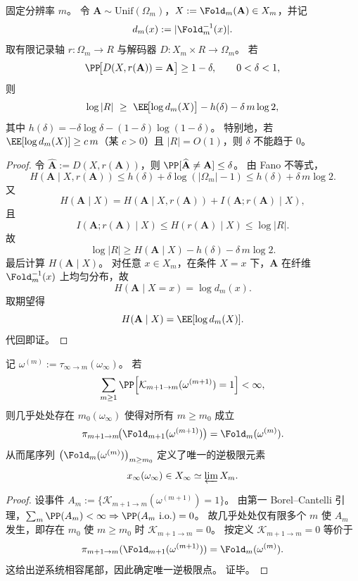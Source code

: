 \begin{theorem}\label{thm:killo-fold-approx-address-fano-lower-bound}
固定分辨率 \(m\)。
令 \(\mathbf A\sim\mathrm{Unif}(\Omega_m)\)，\(X:=\Fold_m(\mathbf A)\in X_m\)，并记
\[
d_m(x):=|\Fold_m^{-1}(x)|.
\]
取有限记录轴 \(r:\Omega_m\to R\) 与解码器 \(D:X_m\times R\to\Omega_m\)。
若
\[
\PP\!\bigl[D(X,r(\mathbf A))=\mathbf A\bigr]\ge 1-\delta,\qquad 0<\delta<1,
\]
则
\[
\log|R|\ \ge\ \EE\!\bigl[\log d_m(X)\bigr]-h(\delta)-\delta\,m\log 2,
\]
其中 \(h(\delta)=-\delta\log\delta-(1-\delta)\log(1-\delta)\)。
特别地，若 \(\EE[\log d_m(X)]\ge c\,m\)（某 \(c>0\)）且 \(|R|=O(1)\)，则 \(\delta\) 不能趋于 \(0\)。
\end{theorem}
\begin{proof}
令 \(\widehat{\mathbf A}:=D(X,r(\mathbf A))\)，则
\(
\PP[\widehat{\mathbf A}\neq \mathbf A]\le \delta
\)。
由 Fano 不等式，
\[
H(\mathbf A\mid X,r(\mathbf A))
\le
h(\delta)+\delta\log(|\Omega_m|-1)
\le
h(\delta)+\delta\,m\log 2.
\]
又
\[
H(\mathbf A\mid X)
=
H(\mathbf A\mid X,r(\mathbf A))+I(\mathbf A;r(\mathbf A)\mid X),
\]
且
\[
I(\mathbf A;r(\mathbf A)\mid X)\le H(r(\mathbf A)\mid X)\le \log|R|.
\]
故
\[
\log|R|
\ge
H(\mathbf A\mid X)-h(\delta)-\delta\,m\log 2.
\]
最后计算 \(H(\mathbf A\mid X)\)。
对任意 \(x\in X_m\)，在条件 \(X=x\) 下，\(\mathbf A\) 在纤维 \(\Fold_m^{-1}(x)\) 上均匀分布，故
\[
H(\mathbf A\mid X=x)=\log d_m(x).
\]
取期望得
\[
H(\mathbf A\mid X)=\EE[\log d_m(X)].
\]
代回即证。
\end{proof}

\begin{proposition}[曲率事件可和蕴含最终一致的逆极限提升]\label{prop:killo-curvature-summable-eventual-inverse-limit-lift}
记 \(\omega^{(m)}:=\tau_{\infty\to m}(\omega_\infty)\)。
若
\[
\sum_{m\ge 1}\PP\!\left[\mathcal K_{m+1\to m}(\omega^{(m+1)})=1\right]<\infty,
\]
则几乎处处存在 \(m_0(\omega_\infty)\) 使得对所有 \(m\ge m_0\) 成立
\[
\pi_{m+1\to m}\!\bigl(\Fold_{m+1}(\omega^{(m+1)})\bigr)
=
\Fold_m(\omega^{(m)}).
\]
从而尾序列 \(\bigl(\Fold_m(\omega^{(m)})\bigr)_{m\ge m_0}\) 定义了唯一的逆极限元素
\[
x_\infty(\omega_\infty)\in X_\infty\simeq \varprojlim X_m.
\]
\end{proposition}
\begin{proof}
设事件
\(
A_m:=\{\mathcal K_{m+1\to m}(\omega^{(m+1)})=1\}
\)。
由第一 Borel--Cantelli 引理，\(\sum_m\PP(A_m)<\infty\Rightarrow \PP(A_m\ \mathrm{i.o.})=0\)。
故几乎处处仅有限多个 \(m\) 使 \(A_m\) 发生，即存在 \(m_0\) 使 \(m\ge m_0\) 时 \(\mathcal K_{m+1\to m}=0\)。
按定义 \(\mathcal K_{m+1\to m}=0\) 等价于
\[
\pi_{m+1\to m}(\Fold_{m+1}(\omega^{(m+1)}))=\Fold_m(\omega^{(m)}).
\]
这给出逆系统相容尾部，因此确定唯一逆极限点。
证毕。
\end{proof}


